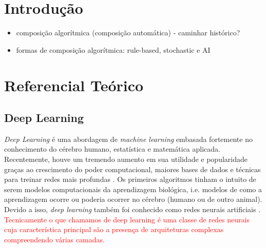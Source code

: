 \documentclass{automatextcc}
\newcommand{\pumi}[1]{\textcolor{red}{#1}}
\begin{document}
\listoftables




\chapter{Introdução}

\begin{itemize}
    \item composição algorítmica (composição automática) - caminhar histórico?
    \item formas de composição algorítmica: rule-based, stochastic e AI
\end{itemize}





\chapter{Referencial Teórico}


\section{Deep Learning}
\textit{Deep Learning} é uma abordagem de \textit{machine learning} embasada fortemente no conhecimento do cérebro humano, estatística e matemática aplicada. Recentemente, houve um tremendo aumento em sua utilidade e popularidade graças ao crescimento do poder computacional, maiores bases de dados e técnicas para treinar redes mais profundas \citep{mit2016deeplearningbook}. Os primeiros algoritmos tinham o intuito de serem modelos computacionais da aprendizagem biológica, i.e. modelos de como a aprendizagem ocorre ou poderia ocorrer no cérebro (humano ou de outro animal). Devido a isso, \textit{deep learning} também foi conhecido como redes neurais artificiais \citep{mit2016deeplearningbook}. \pumi{Tecnicamente o que chamamos de deep learning é uma classe de redes neurais cuja característica principal são a presença de arquiteturas complexas compreendendo várias camadas. } 
\end{document}
